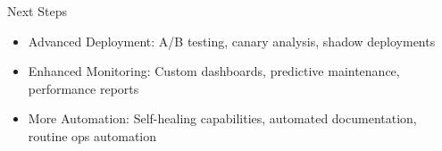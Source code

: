 \documentclass[aspectratio=169]{beamer}
\begin{document}


\begin{frame}{Next Steps}


\begin{itemize}
\item Advanced Deployment: A/B testing, canary analysis, shadow deployments
\item Enhanced Monitoring: Custom dashboards, predictive maintenance, performance reports
\item More Automation: Self-healing capabilities, automated documentation, routine ops automation
\end{itemize}
\end{frame}
\end{document}

